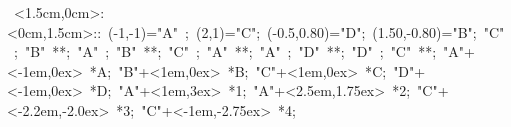 \hbox{
\xy    <1.5cm,0cm>:<0cm,1.5cm>::
       (-1,-1)="A" ;  (2,1)="C";  (-0.5,0.80)="D";   
	   (1.50,-0.80)="B";  
	   "C" ; "B" **\dir{-}; 
       "A" ; "B" **\dir{-}; 
       "C" ; "A" **\dir{-}; 
       "A" ; "D" **\dir{-}; 
       "D" ; "C" **\dir{-}; 
       "A"+<-1em,0ex> *{A};
	   "B"+<1em,0ex> *{B};
       "C"+<1em,0ex> *{C};
       "D"+<-1em,0ex> *{D};
       "A"+<1em,3ex> *{1};
       "A"+<2.5em,1.75ex> *{2};
       "C"+<-2.2em,-2.0ex> *{3};
       "C"+<-1em,-2.75ex> *{4};
       \endxy}
